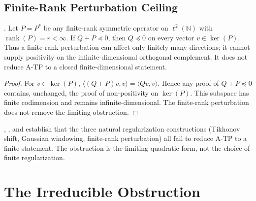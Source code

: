\subsection{Finite-Rank Perturbation Ceiling}
\label{v4-arith:w7-h:regularizations:finite-rank}

\begin{theorem}
\label{v4-arith:w7-h:thm:finite-rank-ceiling}
\ClaimStatusProvedHere. Let \(P=P^{*}\) be any finite-rank symmetric
operator on \(\ell^{2}(\mathbb{N})\) with \(\operatorname{rank}(P)=r<\infty\).
If \(Q+P\preceq0\), then \(Q\preceq0\) on every vector \(v\in\ker(P)\).
Thus a finite-rank perturbation can affect only finitely many
directions; it cannot supply positivity on the infinite-dimensional
orthogonal complement. It does not reduce A-TP to a closed
finite-dimensional statement.
\end{theorem}

\begin{proof}
For \(v\in\ker(P)\), \(\langle(Q+P)v,v\rangle=\langle Qv,v\rangle\).
Hence any proof of \(Q+P\preceq0\) contains, unchanged, the proof of
non-positivity on \(\ker(P)\). This subspace has finite codimension
and remains infinite-dimensional. The finite-rank perturbation does
not remove the limiting obstruction.
\end{proof}

\begin{remark}
\label{v4-arith:w7-h:rem:three-failures}
,
, and
 establish that the three
natural regularization constructions (Tikhonov shift, Gaussian windowing,
finite-rank perturbation) all fail to reduce A-TP to a finite
statement. The obstruction is the limiting quadratic form, not the
choice of finite regularization.
\end{remark}

\section{The Irreducible Obstruction}
\label{v4-arith:w7-h:irreducible}

